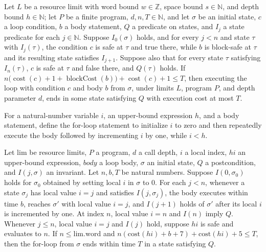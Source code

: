 \begin{theorem}
\label{Light.Ends.whileBlock}
\leanok
{}
Let $L$ be a resource limit with word bound $w\in\mathbb Z$, space bound $s\in\mathbb
N$, and depth bound $h\in\mathbb N$; let $P$ be a finite program, $d,n,T\in\mathbb N$,
and let $\sigma$ be an initial state, $c$ a loop condition, $b$ a body statement, $Q$ a
predicate on states, and $I_j$ a state predicate for each $j\in\mathbb N$. Suppose
$I_0(\sigma)$ holds, and for every $j<n$ and state $\tau$ with $I_j(\tau)$, the
condition $c$ is safe at $\tau$ and true there, while $b$ is block-safe at $\tau$ and
its resulting state satisfies $I_{j+1}$. Suppose also that for every state $\tau$
satisfying $I_n(\tau)$, $c$ is safe at $\tau$ and false there, and $Q(\tau)$ holds. If
$n\bigl(\operatorname{cost}(c)+1+\operatorname{blockCost}(b)\bigr)+\operatorname{cost}(c)+1\le
T$, then executing the loop with condition $c$ and body $b$ from $\sigma$, under limits
$L$, program $P$, and depth parameter $d$, ends in some state satisfying $Q$ with
execution cost at most $T$.
\end{theorem}

\begin{definition}
\label{Light.Stmt.for}
\leanok
{}
For a natural-number variable $i$, an upper-bound expression $h$, and a body statement,
define the for-loop statement to initialize $i$ to zero and then repeatedly execute the
body followed by incrementing $i$ by one, while $i<h$.
\end{definition}

\begin{theorem}
\label{Light.Ends.for}
\leanok
{}
Let $\mathrm{lim}$ be resource limits, $P$ a program, $d$ a call depth, $i$ a local index,
$hi$ an upper-bound expression, $body$ a loop body, $\sigma$ an initial state, $Q$ a
postcondition, and $I(j,\sigma)$ an invariant. Let $n,b,T$ be natural numbers. Suppose
$I(0,\sigma_0)$ holds for $\sigma_0$ obtained by setting local $i$ in $\sigma$ to $0$. For
each $j<n$, whenever a state $\sigma_j$ has local value $i=j$ and satisfies $I(j,\sigma_j)$,
the body executes within time $b$, reaches $\sigma\prime$ with local value $i=j$, and
$I(j+1)$ holds of $\sigma\prime$ after its local $i$ is incremented by one.
At index $n$, local value $i=n$ and $I(n)$ imply $Q$. Whenever $j\le n$, local value
$i=j$ and $I(j)$ hold, suppose $hi$ is safe and evaluates to $n$. If $n\le\mathrm{lim.word}$
and $n(\mathrm{cost}(hi)+b+7)+\mathrm{cost}(hi)+5\le T$, then the for-loop from
$\sigma$ ends within time $T$ in a state satisfying $Q$.
\end{theorem}

